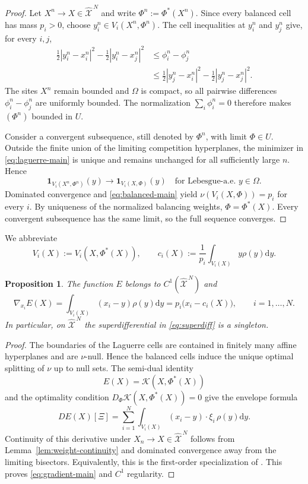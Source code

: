 \documentclass[11pt]{article}
\def\Xc{{\mathcal X}}
\def\id{\mathbf{1}}
\def\hX{\widehat{\Xc}^{\,N}}
\newcommand{\dd}{\mathrm{d}}
\newcommand{\Kant}{\mathscr K}
\newtheorem{proposition}[theorem]{Proposition}
\theoremstyle{definition}
\theoremstyle{remark}
\numberwithin{equation}{section}
\begin{document}
\begin{proof}
Let $X^n\to X\in\hX$ and write $\Phi^n:=\Phi^*(X^n)$.  Since every balanced cell has mass
$p_i>0$, choose $y_i^n\in V_i(X^n,\Phi^n)$.  The cell inequalities at $y_i^n$ and $y_j^n$ give,
for every $i,j$,
\begin{align*}
 \frac12|y_i^n-x_i^n|^2-\frac12|y_i^n-x_j^n|^2
 &\le \phi_i^n-\phi_j^n\\
 &\le
 \frac12|y_j^n-x_i^n|^2-\frac12|y_j^n-x_j^n|^2.
\end{align*}
The sites $X^n$ remain bounded and $\Omega$ is compact, so all pairwise differences
$\phi_i^n-\phi_j^n$ are uniformly bounded.  The normalization $\sum_i\phi_i^n=0$ therefore makes
$(\Phi^n)$ bounded in $U$.

Consider a convergent subsequence, still denoted by $\Phi^n$, with limit $\Phi\in U$.  Outside the
finite union of the limiting competition hyperplanes, the minimizer in
\eqref{eq:laguerre-main} is unique and remains unchanged for all sufficiently large $n$.  Hence
\[
 \id_{V_i(X^n,\Phi^n)}(y)\longrightarrow\id_{V_i(X,\Phi)}(y)
 \quad\text{for Lebesgue-a.e. }y\in\Omega.
\]
Dominated convergence and \eqref{eq:balanced-main} yield
$\nu(V_i(X,\Phi))=p_i$ for every $i$.  By uniqueness of the normalized balancing weights,
$\Phi=\Phi^*(X)$.  Every convergent subsequence has the same limit, so the full sequence converges.
\end{proof}

We abbreviate
\begin{equation}\label{eq:optimal-cells-centroids}
 V_i(X):=V_i(X,\Phi^*(X)),
 \qquad
 c_i(X):=\frac1{p_i}\int_{V_i(X)}y\rho(y)\dd y.
\end{equation}

\begin{proposition}\label{prop:C1}
The function $E$ belongs to $C^1(\hX)$ and
\begin{equation}\label{eq:gradient-main}
 \nabla_{x_i}E(X)
 =\int_{V_i(X)}(x_i-y)\rho(y)\dd y
 =p_i\bigl(x_i-c_i(X)\bigr),
 \qquad i=1,\ldots,N.
\end{equation}
In particular, on $\hX$ the superdifferential in \eqref{eq:superdiff} is a singleton.
\end{proposition}

\begin{proof}
The boundaries of the Laguerre cells are contained in finitely many affine hyperplanes and are
$\nu$-null.  Hence the balanced cells induce the unique optimal splitting of $\nu$ up to null sets. The semi-dual identity
\begin{equation}\label{eq:E-dual-main}
 E(X)=\Kant(X,\Phi^*(X))
\end{equation}
and the optimality condition $D_\Phi\Kant(X,\Phi^*(X))=0$ give the envelope formula
\[
 DE(X)[\Xi]
 =\sum_{i=1}^N\int_{V_i(X)}(x_i-y)\cdot\xi_i\,\rho(y)\dd y.
\]
Continuity of this derivative under $X_n\to X\in\hX$ follows from
Lemma~\ref{lem:weight-continuity} and dominated convergence away from the limiting bisectors.
Equivalently, this is the first-order specialization of
\cite[Theorem 1 and Proposition 1.1]{deGournayKahnLebrat2019}.  This proves
\eqref{eq:gradient-main} and $C^1$ regularity.
\end{proof}
\end{document}
